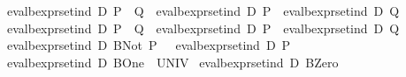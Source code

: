 \begin{isabellebody}
{}\ {}eval{}bexpr{}set{}ind\ D\ {}P\ {}{}{}\ Q{}\ {}\ eval{}bexpr{}set{}ind\ D\ P\ {}\ eval{}bexpr{}set{}ind\ D\ Q{}\isanewline
{}\ {}eval{}bexpr{}set{}ind\ D\ {}P\ {}{}{}\ Q{}\ {}\ eval{}bexpr{}set{}ind\ D\ P\ {}\ eval{}bexpr{}set{}ind\ D\ Q{}\isanewline
{}\ {}eval{}bexpr{}set{}ind\ D\ {}BNot\ P{}\ {}\ {}\ eval{}bexpr{}set{}ind\ D\ P{}\isanewline
{}\ {}eval{}bexpr{}set{}ind\ D\ BOne\ {}\ UNIV{}\isanewline
{}\ {}eval{}bexpr{}set{}ind\ D\ BZero\ {}\ {}{}{}\isanewline

\end{isabellebody}
